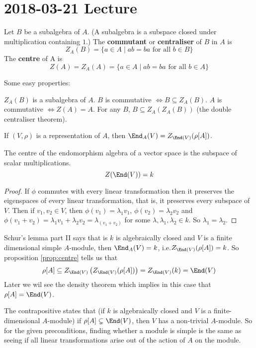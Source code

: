 \section{2018-03-21 Lecture}

\begin{defn}
	Let $B$ be a subalgebra of $A$.
	(A subalgebra is a subspace closed under multiplication containing $1$.)
	The \textbf{commutant} or \textbf{centraliser} of $B$ in $A$ is
	\[Z_A(B) = \{a \in A \mid ab=ba \text{ for all } b \in B\}\]
	The \textbf{centre} of A is
	\[Z(A) = Z_A(A) = \{a \in A \mid ab=ba \text{ for all } b \in A\}\]
\end{defn}

\begin{prop}\label{prop:centre}
	Some easy properties:
	\begin{itm}
		\io $Z_A(B)$ is a subalgebra of $A$.
		\io $B$ is commutative $\iff B \subseteq Z_A(B)$.
		\io $A$ is commutative $\iff Z(A)=A$.
		\io For any $B$, $B \subseteq Z_A(Z_A(B))$ (the double centraliser theorem).
	\end{itm}
\end{prop}

\begin{exam}
	If $(V,\rho)$ is a representation of $A$, then $\End_A(V) = Z_{\End(V)}(\rho[A])$.
\end{exam}

\begin{lem}
	The centre of the endomorphism algebra of a vector space is the subspace of scalar multiplications.
	\[Z(\End(V))=k\]
\end{lem}

\begin{proof}
	If $\phi$ commutes with every linear transformation then it preserves the eigenspaces of every linear transformation, that is, it preserves every subspace of $V$.
	Then if $v_1,v_2 \in V$, then $\phi(v_1)=\lambda_1v_1$, $\phi(v_2)=\lambda_2v_2$ and $\phi(v_1+v_2)=\lambda_1v_1+\lambda_2v_2 = \lambda_(v_1+v_2)$ for some $\lambda,\lambda_1,\lambda_2 \in k$.
	So $\lambda_1=\lambda_2$.
\end{proof}

\begin{note}
	Schur's lemma part II says that is $k$ is algebraically closed and $V$ is a finite dimensional simple $A$-module, then $\End_A(V)=k$, i.e.\@ $Z_{\End(V)}(\rho[A])=k$.
	So proposition \ref{prop:centre} tells us that
	\[\rho[A] \subseteq Z_{\End(V)}\left(Z_{\End(V)}(\rho[A])\right) = Z_{\End(V)}(k) = \End(V)\]
	Later we wil see the density theorem which implies in this case that $\rho[A]=\End(V)$.
	
	The contrapositive states that (if $k$ is algebraically closed and $V$ is a finite-dimensional $A$-module) if $\rho[A] \subsetneq \End(V)$, then $V$ has a non-trivial $A$-module.
	So for the given preconditions, finding whether a module is simple is the same as seeing if all linear transformations arise out of the action of $A$ on the module.
\end{note}

